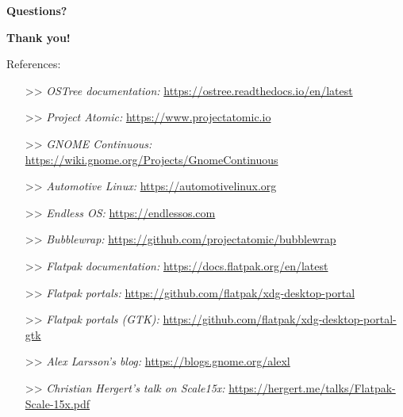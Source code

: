 %
%
%
\begin{frame}
  \begin{center}
  \Huge
  \textbf{Questions?}
  \end{center}
\end{frame}

\begin{frame}
  \begin{center}
  \Huge
  \textbf{Thank you!}
  \end{center}
\end{frame}

\begin{frame}
  References:\vspacing
  \begin{tiny}
    \begin{itemize}
    \item[>>] \textit{OSTree documentation:} \url{https://ostree.readthedocs.io/en/latest}\vspacing
    \item[>>] \textit{Project Atomic:} \url{https://www.projectatomic.io}\vspacing
    \item[>>] \textit{GNOME Continuous:} \url{https://wiki.gnome.org/Projects/GnomeContinuous}\vspacing
    \item[>>] \textit{Automotive Linux:} \url{https://automotivelinux.org}\vspacing
    \item[>>] \textit{Endless OS:} \url{https://endlessos.com}\vspacing
    \item[>>] \textit{Bubblewrap:} \url{https://github.com/projectatomic/bubblewrap}\vspacing
    \item[>>] \textit{Flatpak documentation:} \url{https://docs.flatpak.org/en/latest}\vspacing
    \item[>>] \textit{Flatpak portals:} \url{https://github.com/flatpak/xdg-desktop-portal}\vspacing
    \item[>>] \textit{Flatpak portals (GTK):} \url{https://github.com/flatpak/xdg-desktop-portal-gtk}\vspacing
    \item[>>] \textit{Alex Larsson's blog:} \url{https://blogs.gnome.org/alexl}\vspacing
    \item[>>] \textit{Christian Hergert's talk on Scale15x:} \url{https://hergert.me/talks/Flatpak-Scale-15x.pdf}
    \end{itemize}
  \end{tiny}
\end{frame}
